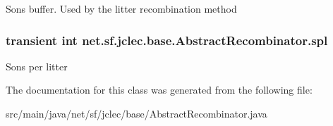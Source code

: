 Sons buffer. Used by the litter recombination method \hypertarget{classnet_1_1sf_1_1jclec_1_1base_1_1_abstract_recombinator_acc9ceca89a1680db0a6ec818c1ac2a67}{
\subsubsection[{spl}]{\setlength{\rightskip}{0pt plus 5cm}transient int net.\-sf.\-jclec.\-base.\-Abstract\-Recombinator.\-spl\hspace{0.3cm}{\ttfamily [protected]}}}\label{classnet_1_1sf_1_1jclec_1_1base_1_1_abstract_recombinator_acc9ceca89a1680db0a6ec818c1ac2a67}
Sons per litter 

The documentation for this class was generated from the following file\-:\begin{DoxyCompactItemize}
\item 
src/main/java/net/sf/jclec/base/Abstract\-Recombinator.\-java\end{DoxyCompactItemize}
